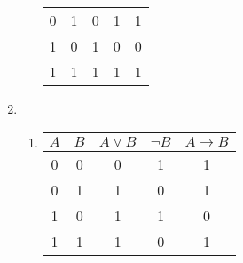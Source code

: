 \documentclass[a4paper, 12pt]{article}  %
\begin{document}
\begin{enumerate}
\begin{enumerate}
\begin{tabular}[t]{cc|cc|c}
            0 & 1 & 0 & 1 & 1 \\
            1 & 0 & 1 & 0 & 0 \\
            1 & 1 & 1 & 1 & 1 \\
        \end{tabular}
    \end{enumerate}
    \item [\boxed{4}]
    \begin{enumerate}
        \item
        \begin{tabular}[t]{cccc|c}
            \(A\) & \(B\) & \(A \lor B\) & \(\neg B\) & \(A \to B\) \\
            \hline
            0 & 0 & 0 & 1 & 1 \\
            0 & 1 & 1 & 0 & 1 \\
            1 & 0 & 1 & 1 & 0 \\
            1 & 1 & 1 & 0 & 1 \\            
        \end{tabular}
    \end{enumerate}
\end{enumerate}

\end{document}
